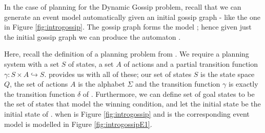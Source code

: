 \documentclass[ %
                    author={Leo Poulson},
                supervisor={Dr. Steven Ramsay},
                    degree={BSc},
                     title={Epistemic Planning for the Dynamic Gossip problem},
                  subtitle={},
                      year={2019} ]{dissertation}
\begin{document}
In the case of planning for the Dynamic Gossip problem, recall that we can
generate an event model  automatically given an initial gossip graph -
like the one in Figure \ref{fig:introgossip}. The gossip graph forms the model
; hence given just the initial gossip graph we can produce the automaton
\mestar.

Here, recall the definition of a planning problem from . We
require a planning system with a set $S$ of states, a set $A$ of actions and a
partial transition function $\gamma : S \times A \hookrightarrow S$. \mestar
provides us with all of these; our set of states $S$ is the state space $Q$, the
set of actions $A$ is the alphabet $\Sigma$ and the transition function $\gamma$
is exactly the transition function $\delta$ of \mestar. Furthermore, we can
define set of goal states to be the set of states that model the winning
condition, and let the initial state be the initial state of \mestar. \mestar
when  is Figure \ref{fig:introgossip} and  is the corresponding
event model is modelled in Figure \ref{fig:introgossipE1}.
\end{document}
